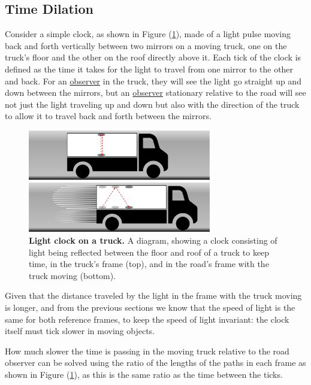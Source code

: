 \subsection{Time Dilation} \label{Subsect: Time Dilation}

Consider a simple clock, as shown in Figure (\ref{fig: truck clock}), made of a light pulse moving back and forth vertically between two mirrors on a moving truck, one on the truck's floor and the other on the roof directly above it.
Each tick of the clock is defined as the time it takes for the light to travel from one mirror to the other and back.
For an \hyperlink{def-observer}{observer} in the truck, they will see the light go straight up and down between the mirrors, but an \hyperlink{def-observer}{observer} stationary relative to the road will see not just the light traveling up and down but also with the direction of the truck to allow it to travel back and forth between the mirrors.

\begin{figure}[H]
	\centering
	\includegraphics[width = 8cm]{images/pdf/lorry_clock.pdf}
	\caption{\textbf{Light clock on a truck.} A diagram, showing a clock consisting of light being reflected between the floor and roof of a truck to keep time, in the truck's frame (top), and in the road's frame with the truck moving (bottom).}
	\label{fig: truck clock}
\end{figure}

%

Given that the distance traveled by the light in the frame with the truck moving is longer, and from the previous sections we know that the speed of light is the same for both reference frames, to keep the speed of light invariant: the clock itself must tick slower in moving objects.

How much slower the time is passing in the moving truck relative to the road observer can be solved using the ratio of the lengths of the paths in each frame as shown in Figure (\ref{fig: truck clock}), as this is the same ratio as the time between the ticks.

